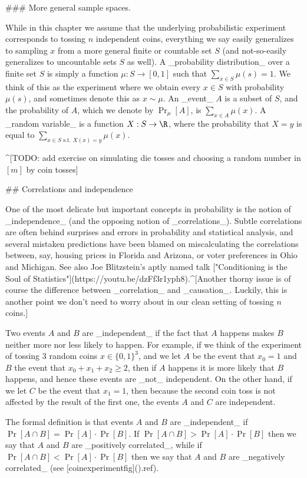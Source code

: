 ### More general sample spaces.

While in this chapter we assume that the underlying probabilistic experiment   corresponds to tossing $n$ independent coins, everything we say easily generalizes to sampling $x$ from a more general finite or countable set $S$ (and not-so-easily generalizes to uncountable sets $S$ as well).
A _probability distribution_  over a finite set $S$ is simply a function $\mu : S \rightarrow [0,1]$ such that
$\sum_{x\in S}\mu(s)=1$.
We think of this as the experiment where we obtain every $x\in S$ with probability $\mu(s)$, and sometimes denote this as $x\sim \mu$.
An _event_ $A$ is a subset of $S$, and the probability of $A$, which we denote by $\Pr_\mu[A]$, is $\sum_{x\in A} \mu(x)$.
A _random variable_ is a function $X:S \rightarrow \R$, where the probability that $X=y$ is equal to $\sum_{x\in S \text{ s.t. } X(x)=y} \mu(x)$.


^[TODO: add exercise on simulating die tosses and choosing a random number in $[m]$ by coin tosses]


## Correlations and independence

One of the most delicate but important concepts in probability is the notion of _independence_ (and the opposing notion of _correlations_).
Subtle correlations are often behind surprises and errors in probability and statistical analysis, and several mistaken predictions have been blamed on miscalculating the correlations between, say, housing prices in Florida and Arizona, or voter preferences in Ohio and Michigan. See also Joe Blitzstein's aptly named talk ["Conditioning is the Soul of Statistics"](https://youtu.be/dzFf3r1yph8).^[Another thorny issue is of course the difference between _correlation_ and _causation_. Luckily, this is another point we don't need to worry about in our clean setting of tossing $n$ coins.]

Two events $A$ and $B$ are _independent_ if the fact that $A$ happens makes $B$ neither more nor less likely to happen.
For example, if we think of the experiment of tossing $3$ random coins $x\in \{0,1\}^3$, and we let $A$ be the event that $x_0=1$ and $B$ the event that $x_0 + x_1 + x_2 \geq 2$, then if $A$ happens it is more likely that $B$ happens, and hence these events are _not_ independent.
On the other hand, if we let $C$ be the event that $x_1=1$, then because the second coin toss is not affected by the result of the first one, the events $A$ and $C$ are independent.

The formal definition is that  events $A$ and $B$ are _independent_ if $\Pr[A \cap B]=\Pr[A] \cdot \Pr[B]$.
If $\Pr[A \cap B] > \Pr[A]\cdot \Pr[B]$ then we say that $A$ and $B$ are _positively correlated_, while if $\Pr[ A \cap B] < \Pr[A] \cdot \Pr[B]$ then we say that $A$ and $B$ are _negatively correlated_ (see [coinexperimentfig](){.ref}).



